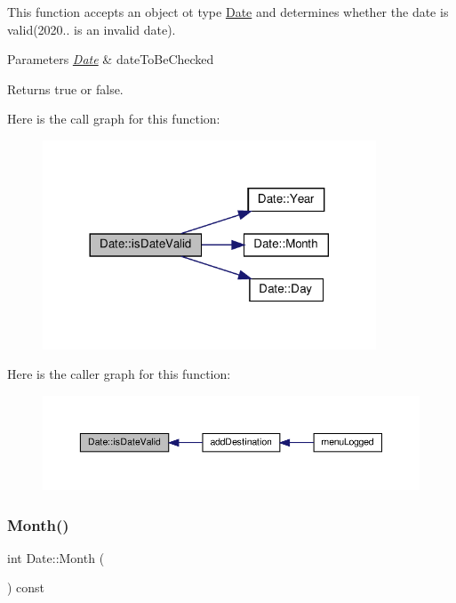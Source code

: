 This function accepts an object ot type \hyperlink{class_date}{Date} and determines whether the date is valid(2020.. is an invalid date). 
\begin{DoxyParams}{Parameters}
{\em \hyperlink{class_date}{Date}} & date\+To\+Be\+Checked \\
\hline
\end{DoxyParams}
\begin{DoxyReturn}{Returns}
true or false. 
\end{DoxyReturn}
Here is the call graph for this function\+:\nopagebreak
\begin{figure}[H]
\begin{center}
\leavevmode
\includegraphics[width=281pt]{class_date_a2d9a87adab3ae18acdb13e027ad1d0aa_cgraph}
\end{center}
\end{figure}
Here is the caller graph for this function\+:\nopagebreak
\begin{figure}[H]
\begin{center}
\leavevmode
\includegraphics[width=350pt]{class_date_a2d9a87adab3ae18acdb13e027ad1d0aa_icgraph}
\end{center}
\end{figure}
\mbox{\label{class_date_a1c1871e2d6adcb08fd30ffae440b3803}} 
\subsubsection{\texorpdfstring{Month()}{Month()}}
{\footnotesize\ttfamily int Date\+::\+Month (\begin{DoxyParamCaption}{ }\end{DoxyParamCaption}) const}

